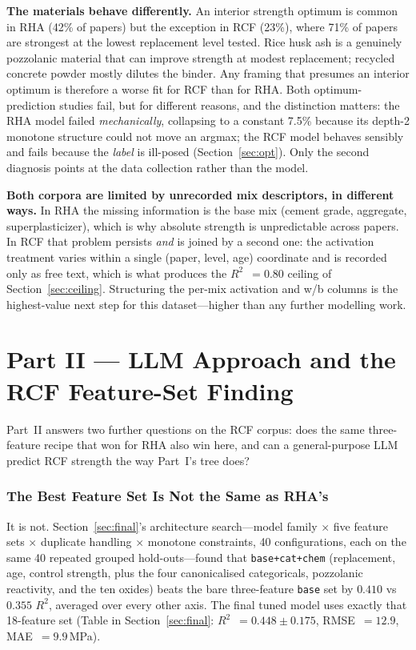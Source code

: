 \documentclass[11pt]{article}
\newcommand{\R}{$R^2$}
\begin{document}
\textbf{The materials behave differently.} An interior strength optimum is common in
RHA (42\% of papers) but the exception in RCF (23\%), where 71\% of papers are
strongest at the lowest replacement level tested. Rice husk ash is a genuinely
pozzolanic material that can improve strength at modest replacement; recycled
concrete powder mostly dilutes the binder. Any framing that presumes an interior
optimum is therefore a worse fit for RCF than for RHA. Both optimum-prediction
studies fail, but for different reasons, and the distinction matters: the RHA model
failed \emph{mechanically}, collapsing to a constant 7.5\% because its depth-2
monotone structure could not move an argmax; the RCF model behaves sensibly and
fails because the \emph{label} is ill-posed (Section~\ref{sec:opt}). Only the second
diagnosis points at the data collection rather than the model.

\textbf{Both corpora are limited by unrecorded mix descriptors, in different ways.}
In RHA the missing information is the base mix (cement grade, aggregate,
superplasticizer), which is why absolute strength is unpredictable across papers.
In RCF that problem persists \emph{and} is joined by a second one: the activation
treatment varies within a single (paper, level, age) coordinate and is recorded only
as free text, which is what produces the \R{}~$=0.80$ ceiling of
Section~\ref{sec:ceiling}. Structuring the per-mix activation and w/b columns is the
highest-value next step for this dataset---higher than any further modelling work.

\part*{Part II --- LLM Approach and the RCF Feature-Set Finding}
\label{sec:part2}

Part~II answers two further questions on the RCF corpus: does the same three-feature
recipe that won for RHA also win here, and can a general-purpose LLM predict RCF
strength the way Part~I's tree does?

\section{The Best Feature Set Is Not the Same as RHA's}
\label{sec:p2-features}
It is not. Section~\ref{sec:final}'s architecture search---model family $\times$ five
feature sets $\times$ duplicate handling $\times$ monotone constraints, 40
configurations, each on the same 40 repeated grouped hold-outs---found that
\texttt{base+cat+chem} (replacement, age, control strength, plus the four canonicalised
categoricals, pozzolanic reactivity, and the ten oxides) beats the bare three-feature
\texttt{base} set by $0.410$ vs $0.355$ \R{}, averaged over every other axis. The final
tuned model uses exactly that 18-feature set (Table in Section~\ref{sec:final}:
\R{}~$=0.448\pm0.175$, RMSE~$=12.9$, MAE~$=9.9$\,MPa).
\end{document}

